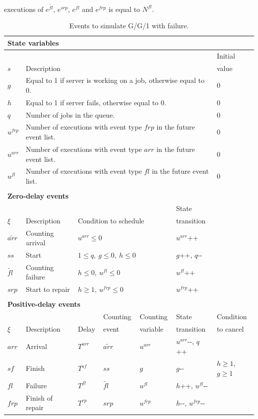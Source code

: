 \documentclass[suppldata]{interact}
\theoremstyle{plain}
\theoremstyle{definition}
\theoremstyle{remark}
\begin{document}
executions of $e^{\tilde{fl}}$, $e^{srp}$, $e^{fl}$ and $e^{frp}$ is equal to $N^{fl}$.

\begin{table}[H]
	\begin{tabular}{lllllll} 
		\multicolumn{7}{l}{\textbf{State variables}}\\ \hline
		&&&&&& Initial\\
		$s$ & \multicolumn{5}{l}{Description}& value\\\hline
		$g$&\multicolumn{5}{l}{Equal to 1 if server is working on a job, otherwise equal to 0.}&0\\
		$h$&\multicolumn{5}{l}{Equal to 1 if server fails, otherwise equal to 0.}&0\\
		$q$&\multicolumn{5}{l}{Number of jobs in the queue.}&0\\
		$u^{frp}$&\multicolumn{5}{l}{Number of executions with event type $frp$ in the future event list.}&0\\
		$u^{arr}$&\multicolumn{5}{l}{Number of executions with event type $arr$ in the future event list.}&0\\
		$u^{fl}$&\multicolumn{5}{l}{Number of executions with event type $fl$ in the future event list.}&0\\
		&&&&&&\\
		\multicolumn{7}{l}{\textbf{Zero-delay events}}\\ \hline
		&&&&& State&\\
		$\xi$&Description &  \multicolumn{3}{l}{Condition to schedule}& transition&\\\hline
		${\tilde{arr}}$ & Counting arrival &  \multicolumn{3}{l}{$u^{arr}\le 0$} & $u^{arr}${\footnotesize++}& \\
		${ss}$&Start&  \multicolumn{3}{l}{$1\le q,\ g\le 0,\ h\le 0$} &$g${\footnotesize++}, $q${\small-}{\small-}&  \\
		${\tilde{fl}}$& Counting failure &  \multicolumn{3}{l}{$h\le 0,\ u^{fl}\le 0$} & $u^{fl}${\footnotesize++}& \\
		${srp}$&Start to repair&\multicolumn{3}{l}{$h\ge 1,\ u^{frp}\le 0$}&  $u^{frp}${\footnotesize++}&  \\
		&&&&&&\\
		\multicolumn{7}{l}{\textbf{Positive-delay events}}\\ \hline
		&&& Counting& Counting  & State& Condition\\
		$\xi$&Description & Delay &  event& variable & transition&to cancel\\\hline
		${arr}$&Arrival & $T^{arr}$& ${\tilde{arr}}$&  $u^{arr}$&  $u^{arr}${\small-}{\small-},  $q${\footnotesize++}&\\	
		${sf}$&Finish & $T^{sf}$& ${ss}$&  $g$&  $g${\small-}{\small-}&$h\ge 1$, $g\ge 1$\\	
		${fl}$&Failure & $T^{fl}$& ${\tilde{fl}}$&  $u^{fl}$&   $h${\footnotesize++}, $u^{fl}${\small-}{\small-}&\\	
		${frp}$&Finish of repair & $T^{rp}$& ${srp}$&  $u^{frp}$&   $h${\small-}{\small-}, $u^{frp}${\small-}{\small-}&\\	\hline
	\end{tabular}
	\caption{Events to simulate G/G/1 with failure.}
	\label{tab:failure}
\end{table}
\end{document}
